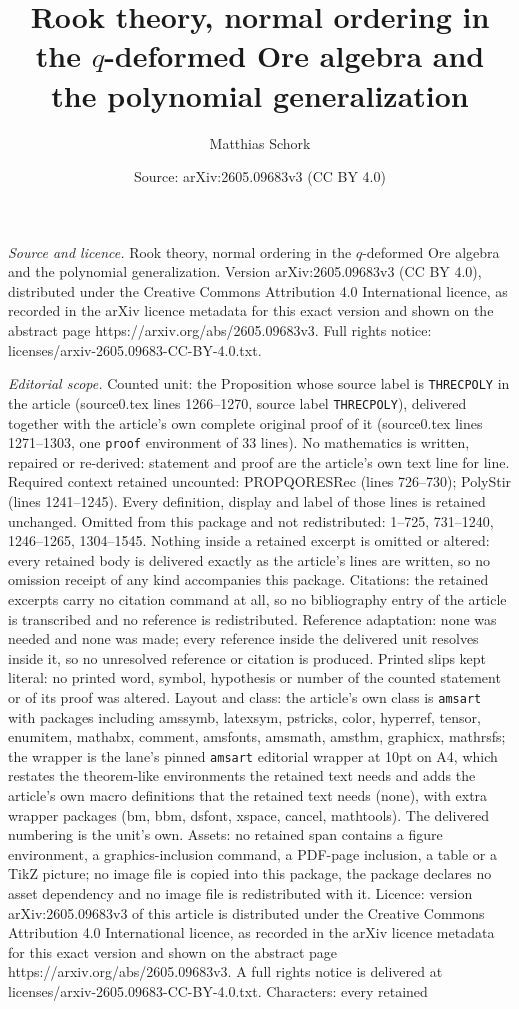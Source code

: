 \documentclass[10pt,a4paper]{amsart}
\title[Rook theory, normal ordering in the $q$-deformed Ore algebra]{Rook theory, normal ordering in the $q$-deformed Ore algebra and the polynomial generalization}
\author{Matthias Schork}
\date{Source: arXiv:2605.09683v3 (CC BY 4.0)}
\begin{document}
\maketitle

\noindent\emph{Source and licence.} Rook theory, normal ordering in the $q$-deformed Ore algebra and the polynomial generalization. Version arXiv:2605.09683v3 (CC BY 4.0), distributed under the Creative Commons Attribution 4.0 International licence, as recorded in the arXiv licence metadata for this exact version and shown on the abstract page https://arxiv.org/abs/2605.09683v3. Full rights notice: licenses/arxiv-2605.09683-CC-BY-4.0.txt.\par\smallskip

\noindent\textit{Editorial scope.} Counted unit: the Proposition whose source label is \texttt{THRECPOLY} in the article (source0.tex lines 1266--1270, source label \texttt{THRECPOLY}), delivered together with the article's own complete original proof of it (source0.tex lines 1271--1303, one \texttt{proof} environment of 33 lines). No mathematics is written, repaired or re-derived: statement and proof are the article's own text line for line. Required context retained uncounted: PROPQORESRec (lines 726--730); PolyStir (lines 1241--1245). Every definition, display and label of those lines is retained unchanged. Omitted from this package and not redistributed: 1--725, 731--1240, 1246--1265, 1304--1545. Nothing inside a retained excerpt is omitted or altered: every retained body is delivered exactly as the article's lines are written, so no omission receipt of any kind accompanies this package. Citations: the retained excerpts carry no citation command at all, so no bibliography entry of the article is transcribed and no reference is redistributed. Reference adaptation: none was needed and none was made; every reference inside the delivered unit resolves inside it, so no unresolved reference or citation is produced. Printed slips kept literal: no printed word, symbol, hypothesis or number of the counted statement or of its proof was altered. Layout and class: the article's own class is \texttt{amsart} with packages including amssymb, latexsym, pstricks, color, hyperref, tensor, enumitem, mathabx, comment, amsfonts, amsmath, amsthm, graphicx, mathrsfs; the wrapper is the lane's pinned \texttt{amsart} editorial wrapper at 10pt on A4, which restates the theorem-like environments the retained text needs and adds the article's own macro definitions that the retained text needs (none), with extra wrapper packages (bm, bbm, dsfont, xspace, cancel, mathtools). The delivered numbering is the unit's own. Assets: no retained span contains a figure environment, a graphics-inclusion command, a PDF-page inclusion, a table or a TikZ picture; no image file is copied into this package, the package declares no asset dependency and no image file is redistributed with it. Licence: version arXiv:2605.09683v3 of this article is distributed under the Creative Commons Attribution 4.0 International licence, as recorded in the arXiv licence metadata for this exact version and shown on the abstract page https://arxiv.org/abs/2605.09683v3. A full rights notice is delivered at licenses/arxiv-2605.09683-CC-BY-4.0.txt. Characters: every retained 
\end{document}
